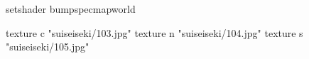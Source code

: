 setshader bumpspecmapworld

    texture c "suiseiseki/103.jpg"
    texture n "suiseiseki/104.jpg"
    texture s "suiseiseki/105.jpg"
